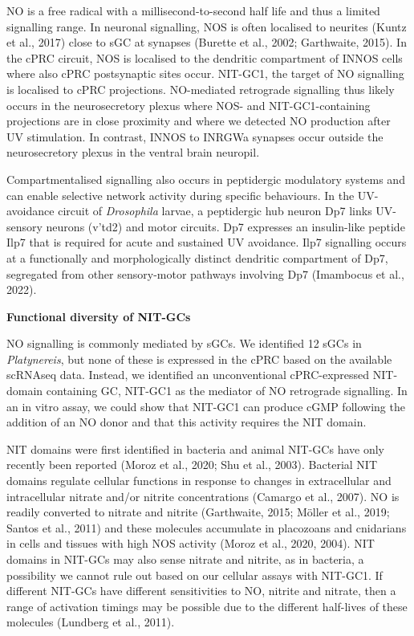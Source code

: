 \documentclass[
  10pt,
  onecolumn]{article}
\begin{document}
NO is a free radical with a millisecond-to-second half life and thus a
limited signalling range. In neuronal signalling, NOS is often localised
to neurites (Kuntz et al., 2017) close to sGC at synapses (Burette et
al., 2002; Garthwaite, 2015). In the cPRC circuit, NOS is localised to
the dendritic compartment of INNOS cells where also cPRC postsynaptic
sites occur. NIT-GC1, the target of NO signalling is localised to cPRC
projections. NO-mediated retrograde signalling thus likely occurs in the
neurosecretory plexus where NOS- and NIT-GC1-containing projections are
in close proximity and where we detected NO production after UV
stimulation. In contrast, INNOS to INRGWa synapses occur outside the
neurosecretory plexus in the ventral brain neuropil.

Compartmentalised signalling also occurs in peptidergic modulatory
systems and can enable selective network activity during specific
behaviours. In the UV-avoidance circuit of \emph{Drosophila} larvae, a
peptidergic hub neuron Dp7 links UV-sensory neurons (v'td2) and motor
circuits. Dp7 expresses an insulin-like peptide Ilp7 that is required
for acute and sustained UV avoidance. Ilp7 signalling occurs at a
functionally and morphologically distinct dendritic compartment of Dp7,
segregated from other sensory-motor pathways involving Dp7 (Imambocus et
al., 2022).

\textbf{Functional diversity of NIT-GCs}

NO signalling is commonly mediated by sGCs. We identified 12 sGCs in
\emph{Platynereis}, but none of these is expressed in the cPRC based on
the available scRNAseq data. Instead, we identified an unconventional
cPRC-expressed NIT-domain containing GC, NIT-GC1 as the mediator of NO
retrograde signalling. In an in vitro assay, we could show that NIT-GC1
can produce cGMP following the addition of an NO donor and that this
activity requires the NIT domain.

NIT domains were first identified in bacteria and animal NIT-GCs have
only recently been reported (Moroz et al., 2020; Shu et al., 2003).
Bacterial NIT domains regulate cellular functions in response to changes
in extracellular and intracellular nitrate and/or nitrite concentrations
(Camargo et al., 2007). NO is readily converted to nitrate and nitrite
(Garthwaite, 2015; Möller et al., 2019; Santos et al., 2011) and these
molecules accumulate in placozoans and cnidarians in cells and tissues
with high NOS activity (Moroz et al., 2020, 2004). NIT domains in
NIT-GCs may also sense nitrate and nitrite, as in bacteria, a
possibility we cannot rule out based on our cellular assays with
NIT-GC1. If different NIT-GCs have different sensitivities to NO,
nitrite and nitrate, then a range of activation timings may be possible
due to the different half-lives of these molecules (Lundberg et al.,
2011).
\end{document}
